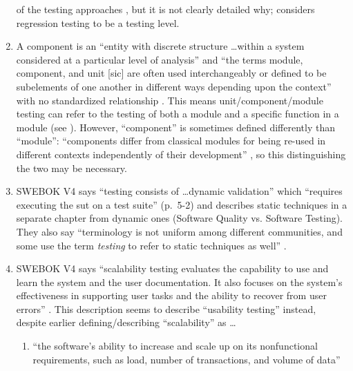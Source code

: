 \begin{enumerate}
            of the testing approaches \citep[p.~23]{IEEE2022}, but it is not
            clearly detailed why; \citet[p.~3]{BarbosaEtAl2006} considers
            regression testing to be a testing level.
      \item A component is an ``entity with discrete structure \dots within a
            system considered at a particular level of analysis''
            \citep{ISO_IEC2023b} and ``the terms module, component, and unit
                  [sic] are often used interchangeably or defined to be subelements
            of one another in different ways depending upon the context'' with
            no standardized relationship \citep[p.~82]{IEEE2017}. This means
            unit/component/module testing can refer to the testing of both a
            module and a specific function in a module (see ).
            However, ``component'' is sometimes defined differently than
            ``module'': ``components differ from classical modules for being
            re-used in different contexts independently of their development''
            \citep[p.~107]{BaresiAndPezzè2006}, so this distinguishing the two
            may be necessary.
      \item SWEBOK V4 says ``testing consists of \dots dynamic validation''
            \citep[p.~5-1]{SWEBOK2024} which ``requires executing the \acs{sut}
            on a test
            suite''  (p.~5-2) and describes static techniques in
            a separate chapter from dynamic ones (Software Quality vs. Software
            Testing). They also say ``terminology is not uniform among different
            communities, and some use the term \emph{testing} to refer to static
            techniques as well'' \citep[p.~5-2]{SWEBOK2024}.
      \item SWEBOK V4 says ``scalability testing evaluates the capability to
            use and learn the system and the user documentation. It also focuses
            on the system's effectiveness in supporting user tasks and the
            ability to recover from user errors'' \citep[p.~5-9]{SWEBOK2024}.
            This description seems to describe ``usability testing'' instead,
            despite earlier defining/describing ``scalability'' as \ldots
            \begin{enumerate}
                  \item ``the software's ability to increase and scale up on its
                        nonfunctional requirements, such as load, number of
                        transactions, and volume of data'' \citep[p.~5-5]{SWEBOK2024}

\end{enumerate}
\end{enumerate}
